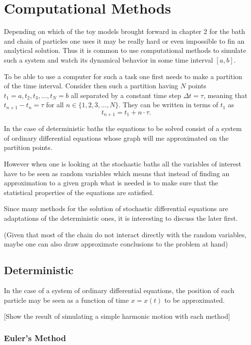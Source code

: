 
\chapter{Computational Methods}

Depending on which of the toy models brought forward in chapter 2 for the bath and chain of particles one uses it may be really hard or even impossible to fin an analytical solution. Thus it is common to use computational methods to simulate such a system and watch its dynamical behavior in some time interval $ [a,b] $.

To be able to use a computer for such a task one first needs to make a partition of the time interval. Consider then such a partition having $ N $ points $ t_1=a, t_2, t_3, \dots, t_N=b $ all separated by a constant time step $ \Delta t = \tau $, meaning that $ t_{n+1} - t_{n} = \tau $ for all $ n\in \{1,2,3,\dots,N\} $. They can be written in terms of $ t_{1} $ as
$$ t_{n+1} = t_{1} + n\cdot \tau. $$

In the case of deterministic baths the equations to be solved consist of a system of ordinary differential equations whose graph will me approximated on the partition points.

However when one is looking at the stochastic baths all the variables of interest have to be seen as random variables which means that instead of finding an approximation to a given graph what is needed is to make sure that the statistical properties of the equations are satisfied.

Since many methods for the solution of stochastic differential equations are adaptations of the deterministic ones, it is interesting to discuss the later first.

(Given that most of the chain do not interact directly with the random variables, maybe one can also draw approximate conclusions to the problem at hand)

\section{Deterministic}

In the case of a system of ordinary differential equations, the position of each particle may be seen as a function of time $ x=x(t) $ to be approximated.

[Show the result of simulating a simple harmonic motion with each method]

\subsection{Euler's Method} 

